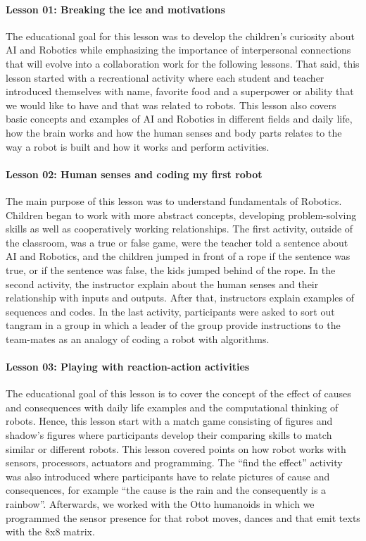 \documentclass[conference]{IEEEtran}
\begin{document}
\paragraph{Lesson 01: Breaking the ice and motivations} 
The educational goal for this lesson was to develop the children’s curiosity about AI and Robotics while emphasizing the importance of interpersonal connections that will evolve into a collaboration work for the following lessons.
That said, this lesson started with a recreational activity where each student and teacher introduced themselves with name, favorite food and a superpower or ability that we would like to have and that was related to robots. This lesson also covers basic concepts and examples of AI and Robotics in different fields and daily life, how the brain works and how the human senses and body parts relates to the way a robot is built and how it works and perform activities.

\paragraph{Lesson 02: Human senses and coding my first robot} 
The main purpose of this lesson was to understand fundamentals of Robotics. 
Children began to work with more abstract concepts, developing problem-solving skills as well as cooperatively working relationships. 
The first activity, outside of the classroom, was a true or false game, were the teacher told a sentence about AI and Robotics, and the children jumped in front of a rope if the sentence was true, or if the sentence was false, the kids jumped behind of the rope.
In the second activity, the instructor explain about the human senses and their relationship with inputs and outputs. After that, instructors explain examples of sequences and codes. 
In the last activity, participants were asked to sort out tangram in a group in which a leader of the group provide instructions to the team-mates as an analogy of coding a robot with algorithms.

\paragraph{Lesson 03: Playing with reaction-action activities} 
The educational goal of this lesson is to cover the concept of the effect of causes and consequences with daily life examples and the computational thinking of robots.
Hence, this lesson start with a match game consisting of figures and shadow’s figures where participants develop their comparing skills to match similar or different robots.
This lesson covered points on how robot works with sensors, processors, actuators and programming. 
The “find the effect” activity was also introduced where participants have to relate pictures of cause and consequences, for example “the cause is the rain and the consequently is a rainbow”.
Afterwards, we worked with the Otto humanoids in which we programmed the sensor presence for that robot moves, dances and that emit texts with the 8x8 matrix.
\end{document}
